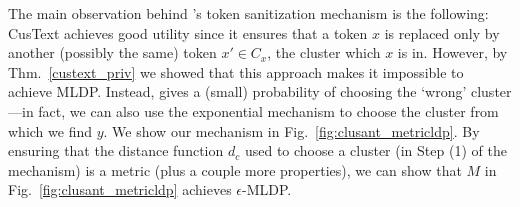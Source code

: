 The main observation behind \clusant's token sanitization mechanism is the following: CusText achieves good utility since it ensures that a token $x$ is replaced only by another (possibly the same) token $x' \in C_x$, the cluster which $x$ is in. However, by Thm.~\ref{custext_priv} we showed that this approach makes it impossible to achieve MLDP. Instead, \clusant gives a (small) probability of choosing the `wrong' cluster---in fact, we can also use the exponential mechanism to choose the cluster from which we find $y$. 
We show our mechanism in Fig.~\ref{fig:clusant_metricldp}.
%
By ensuring that the distance function $d_c$ used to choose a cluster (in Step (1) of the mechanism) is a metric (plus a couple more properties), we can show that $M$ in Fig.~\ref{fig:clusant_metricldp} achieves $\epsilon$-MLDP.


